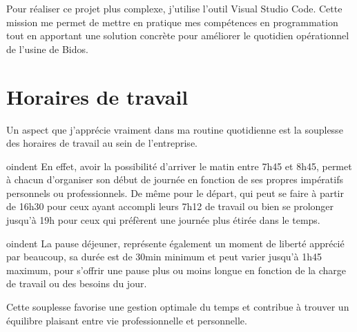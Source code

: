 \noindent Pour réaliser ce projet plus complexe, j'utilise l'outil Visual Studio Code. Cette mission me permet de mettre en pratique mes compétences en programmation tout en apportant une solution concrète pour améliorer le quotidien opérationnel de l'usine de Bidos.

\section*{Horaires de travail}

Un aspect que j'apprécie vraiment dans ma routine quotidienne est la souplesse des horaires de travail au sein de l'entreprise.

oindent En effet, avoir la possibilité d'arriver le matin entre 7h45 et 8h45, permet à chacun d'organiser son début de journée en fonction de ses propres impératifs personnels ou professionnels. De même pour le départ, qui peut se faire à partir de 16h30 pour ceux ayant accompli leurs 7h12 de travail ou bien se prolonger jusqu'à 19h pour ceux qui préfèrent une journée plus étirée dans le temps.

oindent La pause déjeuner, représente également un moment de liberté apprécié par beaucoup, sa durée est de 30min minimum et peut varier jusqu'à 1h45 maximum, pour s'offrir une pause plus ou moins longue en fonction de la charge de travail ou des besoins du jour.

\noindent Cette souplesse favorise une gestion optimale du temps et contribue à trouver un équilibre plaisant entre vie professionnelle et personnelle.

\newpage

